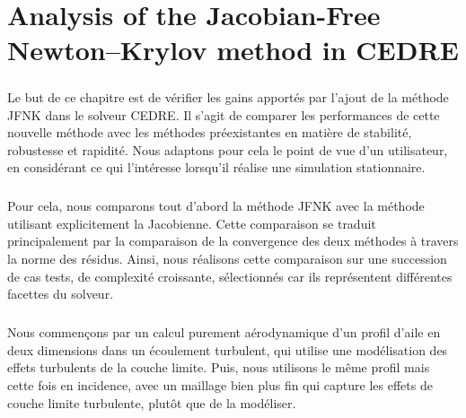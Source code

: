 \chapter{Analysis of the Jacobian-Free Newton--Krylov method in CEDRE}

\begin{tcolorbox}[title=Résumé du chapitre : Analyse de la méthode JFNK dans CEDRE, colframe=black!50!white]
  \paragraph{}
  Le but de ce chapitre est de vérifier les gains apportés par l'ajout de la méthode JFNK dans le solveur CEDRE.
  Il s'agit de comparer les performances de cette nouvelle méthode avec les méthodes préexistantes en matière de stabilité, robustesse et rapidité.
  Nous adaptons pour cela le point de vue d'un utilisateur, en considérant ce qui l'intéresse lorsqu'il réalise une simulation stationnaire.

  \paragraph{}
  Pour cela, nous comparons tout d'abord la méthode JFNK avec la méthode utilisant explicitement la Jacobienne.
  Cette comparaison se traduit principalement par la comparaison de la convergence des deux méthodes à travers la norme des résidus.
  Ainsi, nous réalisons cette comparaison sur une succession de cas tests, de complexité croissante, sélectionnés car ils représentent différentes facettes du solveur.

  \paragraph{}
  Nous commençons par un calcul purement aérodynamique d'un profil d'aile en deux dimensions dans un écoulement turbulent, qui utilise une modélisation des effets turbulents de la couche limite.
  Puis, nous utilisons le même profil mais cette fois en incidence, avec un maillage bien plus fin qui capture les effets de couche limite turbulente, plutôt que de la modéliser.


\end{tcolorbox}

